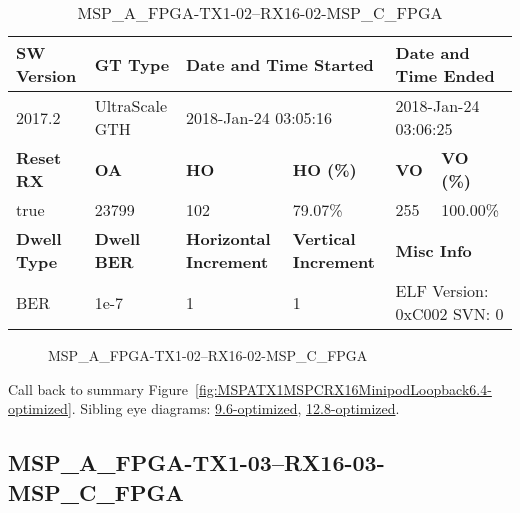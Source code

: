 \begin{table}[h]
\centering
\caption{MSP\_A\_FPGA-TX1-02--RX16-02-MSP\_C\_FPGA}
\label{tab:MSPAFPGATX102RX1602MSPCFPGA6.4-optimized}
\begin{tabular}{@{}|l|l|l|l|l|l|@{}}
\toprule
\textbf{SW Version}                & \textbf{GT Type}   & \multicolumn{2}{l|}{\textbf{Date and Time Started}}            & \multicolumn{2}{l|}{\textbf{Date and Time Ended}}        \\ \midrule
2017.2                       & UltraScale GTH          & \multicolumn{2}{l|}{2018-Jan-24 03:05:16}                   & \multicolumn{2}{l|}{2018-Jan-24 03:06:25}               \\ \midrule
\textbf{Reset RX}                  & \textbf{OA} & \textbf{HO}   & \textbf{HO (\%)} & \textbf{VO} & \textbf{VO (\%)} \\ \midrule
true & 23799        & 102          & 79.07\%        & 255        & 100.00\%       \\ \midrule
\textbf{Dwell Type}                & \textbf{Dwell BER} & \textbf{Horizontal Increment} & \textbf{Vertical Increment}    & \multicolumn{2}{l|}{\textbf{Misc Info}}                  \\ \midrule
BER                            & 1e-7        & 1        & 1           & \multicolumn{2}{l|}{ELF Version: 0xC002 SVN: 0}                         \\ \bottomrule
\end{tabular}
\end{table}

\begin{figure}[h]
\caption{MSP\_A\_FPGA-TX1-02--RX16-02-MSP\_C\_FPGA} \label{fig:MSPAFPGATX102RX1602MSPCFPGA6.4-optimized}
\end{figure}

Call back to summary Figure~\ref{fig:MSPATX1MSPCRX16MinipodLoopback6.4-optimized}.
Sibling eye diagrams: \hyperref[sec:MSPAFPGATX102RX1602MSPCFPGA9.6-optimized]{9.6-optimized}, \hyperref[sec:MSPAFPGATX102RX1602MSPCFPGA12.8-optimized]{12.8-optimized}.

\clearpage
\newpage


\subsection{MSP\_A\_FPGA-TX1-03--RX16-03-MSP\_C\_FPGA}\label{sec:MSPAFPGATX103RX1603MSPCFPGA6.4-optimized}

